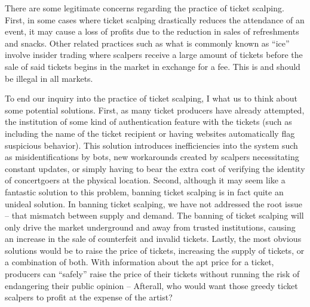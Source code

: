 \documentclass[12pt, a4paper, twoside]{article}
\begin{document}
There are some legitimate concerns regarding the practice of ticket scalping. First, in some cases where ticket scalping drastically reduces the attendance of an event, it may cause a loss of profits due to the reduction in sales of refreshments and snacks. Other related practices such as what is commonly known as “ice” involve insider trading where scalpers receive a large amount of tickets before the sale of said tickets begins in the market in exchange for a fee. This is and should be illegal in all markets.  

To end our inquiry into the practice of ticket scalping, I what us to think about some potential solutions. First, as many ticket producers have already attempted, the institution of some kind of authentication feature with the tickets (such as including the name of the ticket recipient or having websites automatically flag suspicious behavior). This solution introduces inefficiencies into the system such as misidentifications by bots, new workarounds created by scalpers necessitating constant updates, or simply having to bear the extra cost of verifying the identity of concertgoers at the physical location. Second, although it may seem like a fantastic solution to this problem, banning ticket scalping is in fact quite an unideal solution. In banning ticket scalping, we have not addressed the root issue – that mismatch between supply and demand. The banning of ticket scalping will only drive the market underground and away from trusted institutions, causing an increase in the sale of counterfeit and invalid tickets. Lastly, the most obvious solutions would be to raise the price of tickets, increasing the supply of tickets, or a combination of both. With information about the apt price for a ticket, producers can “safely” raise the price of their tickets without running the risk of endangering their public opinion – Afterall, who would want those greedy ticket scalpers to profit at the expense of the artist?  


\nocite{*}
\printbibliography[title=References]
\end{document}

